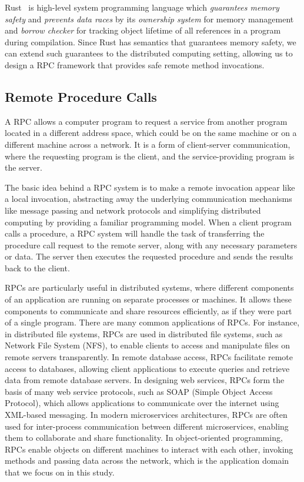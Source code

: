 Rust~\citep{10.5555/3271463} is high-level system programming language which \emph{guarantees memory safety} and \emph{prevents data races} by its \emph{ownership system} for memory management and \emph{borrow checker} for tracking object lifetime of all references in a program during compilation.
Since Rust has semantics that guarantees memory safety, we can extend such guarantees to the distributed computing setting, allowing us to design a RPC framework that provides safe remote method invocations.

\subsection{Remote Procedure Calls}
\label{chap3:background:rpc}
A RPC allows a computer program to request a service from another program located in a different address space, which could be on the same machine or on a different machine across a network. It is a form of client-server communication, where the requesting program is the client, and the service-providing program is the server.

The basic idea behind a RPC system is to make a remote invocation appear like a local invocation, abstracting away the underlying communication mechanisms like message passing and network protocols and simplifying distributed computing by providing a familiar programming model. When a client program calls a procedure, a RPC system will handle the task of transferring the procedure call request to the remote server, along with any necessary parameters or data. The server then executes the requested procedure and sends the results back to the client.

RPCs are particularly useful in distributed systems, where different components of an application are running on separate processes or machines. It allows these components to communicate and share resources efficiently, as if they were part of a single program. There are many common applications of RPCs. For instance, in distributed file systems, RPCs are used in distributed file systems, such as Network File System (NFS), to enable clients to access and manipulate files on remote servers transparently. In remote database access, RPCs facilitate remote access to databases, allowing client applications to execute queries and retrieve data from remote database servers. In designing web services, RPCs form the basis of many web service protocols, such as SOAP (Simple Object Access Protocol), which allows applications to communicate over the internet using XML-based messaging. In modern microservices architectures, RPCs are often used for inter-process communication between different microservices, enabling them to collaborate and share functionality. In object-oriented programming, RPCs enable objects on different machines to interact with each other, invoking methods and passing data across the network, which is the application domain that we focus on in this study.

